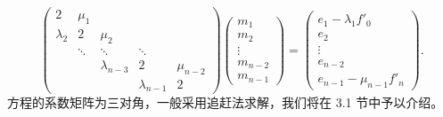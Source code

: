 \[
\begin{pmatrix}
2&\mu_1&&&\\
\lambda_2&2&\mu_2&&\\
&\ddots&\ddots&\ddots&\\
&&\lambda_{n-3}&2&\mu_{n-2}\\
&&&\lambda_{n-1}&2
\end{pmatrix}
\begin{pmatrix}
m_1\\m_2\\\vdots\\m_{n-2}\\m_{n-1}
\end{pmatrix}
=
\begin{pmatrix}
e_1-\lambda_1f'_0\\e_2\\\vdots\\e_{n-2}\\e_{n-1}-\mu_{n-1}f'_n
\end{pmatrix}.
\]
方程的系数矩阵为三对角，一般采用追赶法求解，我们将在 3.1 节中予以介绍。

